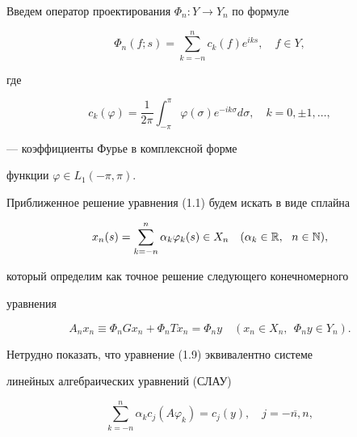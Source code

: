 Введем оператор проектирования $\Phi_{n}:Y \to Y_{n}$ по формуле


\begin{equation}


\Phi_{n}(f;s)=\sum\limits_{k=-n}^{n} c_{k}(f)e^{iks}, \quad f \in Y,


\end{equation}


где


\begin{equation}


c_{k}(\varphi)=\frac{1}{2\pi} \int_{-\pi}^{\pi}


\varphi(\sigma)e^{-ik\sigma}d \sigma, \quad k=0, \pm 1, \dotsc,


\end{equation}


--- коэффициенты Фурье в комплексной форме 


функции $\varphi \in L_1 (-\pi, \pi)$.





Приближенное решение уравнения (1.1) будем искать в виде сплайна


\begin{equation}


x_n (s)=\sum_{k=-n}^{n} \alpha_{k} \varphi_{k}(s) \in X_{n}


\quad (\alpha_{k} \in \R, \ \ n \in \N),


\end{equation}


который определим как точное решение следующего конечномерного


уравнения


\begin{equation}


A_n x_n \equiv \Phi_n G x_n+\Phi_n Tx_n=\Phi_n y \quad( x_n \in X_n,


\ \ \Phi_n y \in Y_n ).


\end{equation}


Нетрудно показать, что уравнение (1.9) эквивалентно системе


линейных алгебраических уравнений (СЛАУ)


\begin{equation}


\sum_{k=-n}^{n} \alpha_k c_j (A \varphi_k)=c_j (y),


\quad j=\overline {-n,n},


\end{equation}


